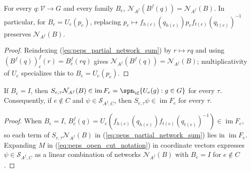 \begin{lemma}%
    \label{thm:peps_partial_vertex_gauge}
    \leanok
    For every $q:\mathcal V\to G$ and every family $B_e$,
    $\mathcal N_{A^f}(B^f(q))=\mathcal N_{A^f}(B)$.
    In particular, for $B_e=U_e(p_e)$, replacing
    $p_e\mapsto f_{h(e)}(q_{h(e)})p_ef_{t(e)}(q_{t(e)})^{-1}$ preserves
    $\mathcal N_{A^f}(B)$.
\end{lemma}
\begin{proof}\leanok
    Reindexing (\ref{eq:peps_partial_network_sum}) by $r\mapsto rq$ and using
    $(B^f(q))_e^f(r)=B_e^f(rq)$ gives $\mathcal N_{A^f}(B^f(q))=\mathcal N_{A^f}(B)$;
    multiplicativity of $U_e$ specializes this to $B_e=U_e(p_e)$.
\end{proof}

\begin{lemma}%
    \label{thm:peps_partial_uncut_support}
    \leanok
    If $B_e=I$, then
    $S_{e,\tau}\mathcal N_{A^f}(B)\in\operatorname{im}F_e=\spn_{\C}\{U_e(g):g\in G\}$
    for every $\tau$. Consequently, if $e\notin C$ and
    $\psi\in\mathcal S_{A^f,C}$, then $S_{e,\tau}\psi\in\operatorname{im}F_e$
    for every $\tau$.
\end{lemma}
\begin{proof}\leanok
    When $B_e=I$, $B_e^f(q)=U_e(f_{h(e)}(q_{h(e)})f_{t(e)}(q_{t(e)})^{-1})\in\operatorname{im}F_e$,
    so each term of $S_{e,\tau}\mathcal N_{A^f}(B)$ in
    (\ref{eq:peps_partial_network_sum}) lies in $\operatorname{im}F_e$.
    Expanding $M$ in (\ref{eq:peps_open_cut_notation}) in coordinate vectors
    expresses $\psi\in\mathcal S_{A^f,C}$ as a linear combination of networks
    $\mathcal N_{A^f}(B)$ with $B_e=I$ for $e\notin C$.
\end{proof}

